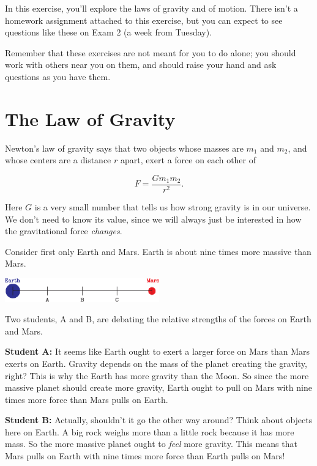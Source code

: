 \documentclass[12pt]{article}
\begin{document}
\Large
\centerline{}

\normalsize

In this exercise, you'll explore the laws of gravity and of motion. There isn't a homework assignment attached to this exercise, but you can expect to see questions like these on Exam 2 (a week from Tuesday).

Remember that these exercises are not meant for you to do alone; you should work with others near you on them, and should raise your hand and ask questions as you have them.

\section{The Law of Gravity}

Newton's law of gravity says that two objects whose masses are $m_1$ and $m_2$, and whose centers
are a distance $r$ apart, exert a force on each other of 

$$
F = \frac{Gm_1m_2}{r^2}.
$$

Here $G$ is a very small number that tells us how strong gravity is in our universe. We don't need to
know its value, since we will always just be interested in how the gravitational force {\it changes}.


Consider first only Earth and Mars. Earth is about nine times more massive than Mars.

\begin{center}
\includegraphics[width=0.5\textwidth]{earth-mars-crop.pdf}
\end{center}

 Two students, A and B, are debating the relative strengths of the forces on Earth and Mars.
	
	\begin{center}
		

	\begin{minipage}{0.9\textwidth}{\bf Student A:} It seems like Earth ought to exert a larger force on Mars than Mars exerts on Earth. Gravity depends on the mass of the planet creating the gravity, right? This is why the Earth has more gravity than the Moon. So since the more massive planet should create more gravity, Earth ought to pull on Mars with nine times more force than Mars pulls on Earth.
	
	\bigskip
	
	{\bf Student B:} Actually, shouldn't it go the other way around? Think about objects here on Earth. A big rock weighs more than a little rock because it has more mass. So the more massive planet ought to {\it feel} more gravity. This means that Mars pulls on Earth with nine times more force than Earth pulls on Mars!
	\end{minipage}
	\end{center}
\end{document}
